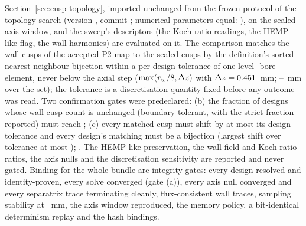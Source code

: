 Section~\ref{sec:cusp-topology}, imported unchanged from the frozen protocol of the topology
search (version \HmcTopologyVersion, commit \texttt{\HmcTopologyResultsCommit}; numerical
parameters equal: \HmcDefinitionParametersEqual), on the sealed \HmcFieldModelLevelLOneA{}
axis window, and the sweep's descriptors (the Koch ratio readings, the HEMP-like flag, the
wall harmonics) are evaluated on it. The comparison matches the wall cusps of the accepted P2
map to the sealed \HmcFieldModelLevelLOneA{} cusps by the definition's sorted
nearest-neighbour bijection within a per-design tolerance of one level-\HmcLevelZeroToken{}
bore element, never below the \HmcFieldModelLevelLOneA{} axial step
($\max(r_w/8, \Delta z)$ with $\Delta z = 0.451$~mm;
\HmcToleranceMinMm{}--\HmcToleranceMaxMm~mm over the set); the tolerance is a discretisation
quantity fixed before any outcome was read. Two confirmation gates were predeclared: (b) the
fraction of designs whose wall-cusp count is unchanged (boundary-tolerant, with the strict
fraction reported) must reach \HmcGateBThreshold; (c) every matched cusp must shift by at
most its design tolerance and every design's matching must be a bijection (largest shift
over tolerance at most \HmcGateCThreshold); \HmcVerdictRule. The HEMP-like preservation, the
wall-field and Koch-ratio ratios, the axis nulls and the discretisation sensitivity are
reported and never gated. Binding for the whole bundle are \HmcBindingGateCount{} integrity
gates: every design resolved and identity-proven, every solve converged (gate (a)), every
axis null converged and every separatrix trace terminating cleanly, flux-consistent wall
traces, sampling stability at \HmcStabilityToleranceMm~mm, the axis window reproduced, the
memory policy, a bit-identical determinism replay and the hash bindings.

